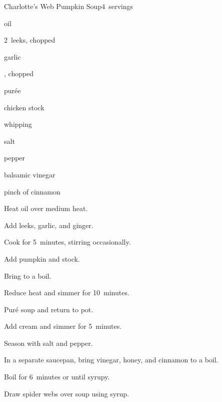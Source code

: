 \begin{recipe}{Charlotte's Web Pumpkin Soup}{}{4~servings}

\begin{ingredients}
\item {} oil
\item 2~leeks, chopped
\item {} garlic
\item {} , chopped
\item {}  pur\'ee
\item {} chicken stock
\item \C{\quarter} whipping 
\item salt
\item pepper
\item \C{\half} balsamic vinegar
\item {} 
\item pinch of cinnamon
\end{ingredients}

\begin{directions}
\item Heat oil over medium heat.
\item Add leeks, garlic, and ginger.
\item Cook for 5~minutes, stirring occasionally.
\item Add pumpkin and stock.
\item Bring to a boil.
\item Reduce heat and simmer for 10~minutes.
\item Pur\'e soup and return to pot.
\item Add cream and simmer for 5~minutes.
\item Season with salt and pepper.
\item In a separate saucepan, bring vinegar, honey, and cinnamon to a boil.
\item Boil for 6~minutes or until syrupy.
\item Draw spider webs over soup using syrup.
\end{directions}

\end{recipe}
